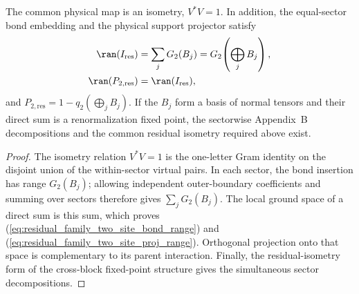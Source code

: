 \begin{lemma}
    \label{thm:residual_family_two_site_support}
    \leanok
    The common physical map is an isometry, $V^*V=1$. In addition, the
    equal-sector bond embedding and the physical support projector satisfy
    \begin{align}
        \ran(I_{\mathrm{res}})
         & =
        \sum_j G_2(B_j) =
        G_2\!\left(\bigoplus_j B_j\right),
        \label{eq:residual_family_two_site_bond_range} \\
        \ran(P_{2,\mathrm{res}})
         & =
        \ran(I_{\mathrm{res}}),
        \label{eq:residual_family_two_site_proj_range}
    \end{align}
    and
    $P_{2,\mathrm{res}} = 1-q_2\!\left(\bigoplus_j B_j\right)$.
    If the $B_j$ form a basis of normal tensors and their direct sum is a
    renormalization fixed point, the sectorwise Appendix~B decompositions and
    the common residual isometry required above exist.
\end{lemma}

\begin{proof}
    \leanok
    The isometry relation $V^*V=1$ is the one-letter Gram identity on the disjoint union
    of the within-sector virtual pairs. In each sector, the bond insertion
    has range $G_2(B_j)$; allowing independent outer-boundary coefficients
    and summing over sectors therefore gives $\sum_jG_2(B_j)$. The local
    ground space of a direct sum is this sum, which proves (\ref{eq:residual_family_two_site_bond_range}) and
    (\ref{eq:residual_family_two_site_proj_range}). Orthogonal projection onto that space is complementary to
    its parent interaction. Finally, the residual-isometry form of the
    cross-block fixed-point structure gives the simultaneous sector
    decompositions.
\end{proof}
